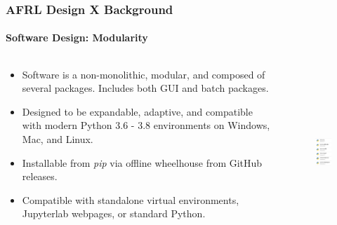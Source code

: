 \documentclass[t]{beamer}
\begin{document}

\begin{frame}
  \frametitle{AFRL Design X Background}
  \framesubtitle{Software Design: Modularity}

  \vspace{-5mm}
  \begin{columns}

    \begin{column}{0.6\textwidth}
      \begin{itemize}
      \item Software is a non-monolithic, modular, and composed of several packages.  Includes both GUI and batch packages.
      \item Designed to be expandable, adaptive, and compatible with modern Python 3.6 - 3.8 environments on Windows, Mac, and Linux.
      \item Installable from \textit{pip} via offline wheelhouse from GitHub releases.
      \item Compatible with standalone virtual environments, Jupyterlab webpages, or standard Python.
      \end{itemize}
    \end{column}

    \begin{column}{0.4\textwidth}
      \vspace{-1.0mm}
      \begin{figure}
        \includegraphics[height=2.5in]{./figures/packages_azure_light.png}
      \end{figure}
    \end{column}

\end{columns}


\end{frame}




\lastframe
    
\end{document}
